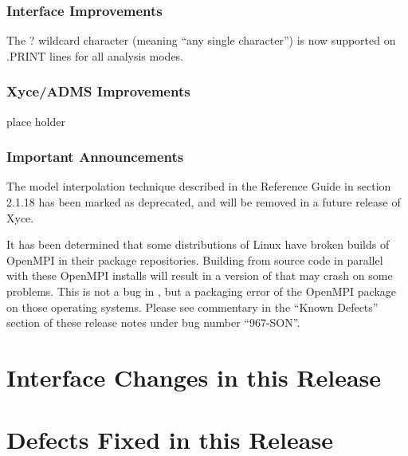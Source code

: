 \documentclass[letterpaper]{scrartcl}
\begin{document}
\subsubsection*{Interface Improvements}
\begin{XyceItemize}
  \item The ? wildcard character (meaning ``any single character'') is now
supported on .PRINT lines for all analysis modes.
\end{XyceItemize}

\subsubsection*{Xyce/ADMS Improvements}
\begin{XyceItemize}
  \item place holder
\end{XyceItemize}

\subsubsection*{Important Announcements}
\begin{XyceItemize}
\item The model interpolation technique described in the \Xyce{}
  Reference Guide in section 2.1.18 has been marked as deprecated, and
  will be removed in a future release of Xyce.
\item It has been determined that some distributions of Linux have
  broken builds of OpenMPI in their package repositories.  Building
  \Xyce{} from source code in parallel with these OpenMPI installs
  will result in a version of \Xyce{} that may crash on some problems.
  This is not a bug in \Xyce{}, but a packaging error of the OpenMPI
  package on those operating systems.  Please see commentary in the
  ``Known Defects'' section of these release notes under bug number
  ``967-SON''.
\end{XyceItemize}

\newpage
\section{Interface Changes in this Release}


\newpage
\section{Defects Fixed in this Release}

\end{document}
